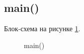 \subsection{main()}

Блок-схема на рисунке \ref{fig:main}.

\begin{figure}[pht]
    \caption{main()}
    \label{fig:main}
\end{figure}





